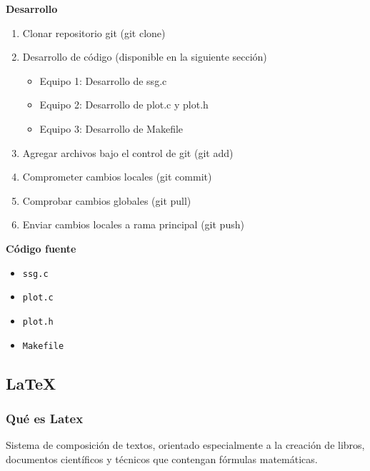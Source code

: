 \textbf{Desarrollo}

\begin{enumerate}

    \item Clonar repositorio git (git clone)
    \item Desarrollo de código (disponible en la siguiente sección)

        \begin{itemize}
            \item Equipo 1: Desarrollo de ssg.c
            \item Equipo 2: Desarrollo de plot.c y plot.h
            \item Equipo 3: Desarrollo de Makefile
        \end{itemize}

    \item Agregar archivos bajo el control de git (git add)
    \item Comprometer cambios locales (git commit)
    \item Comprobar cambios globales (git pull)
    \item Enviar cambios locales a rama principal (git push)

\end{enumerate}

\textbf{Código fuente}

\begin{itemize}
	\item \texttt{ssg.c}
		

	\item \texttt{plot.c}
		

	\item \texttt{plot.h}
		

	\item \texttt{Makefile}
		
\end{itemize}

\newpage

\subsection{\LaTeX}


\subsubsection{Qué es Latex}
Sistema de composición de textos, orientado especialmente a la
creación de libros, documentos científicos y técnicos que contengan
fórmulas matemáticas.

